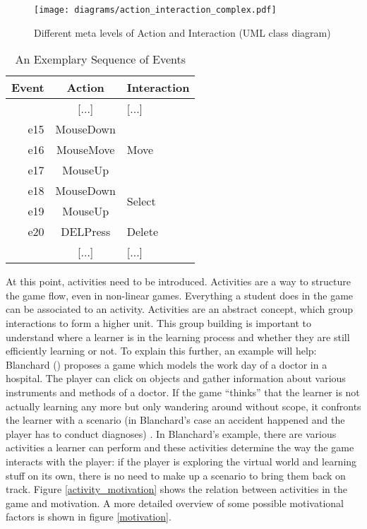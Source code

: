 \begin{figure}
    \centering
    \texttt{[image: diagrams/action\_interaction\_complex.pdf]}
    \caption[Different meta levels of Action and Interaction (UML class diagram)]
    {Different meta levels of Action and Interaction (UML class diagram)}
    \label{action_interaction_complex}
\end{figure}

\begin{table}
\caption[An Exemplary Sequence of Events]
{An Exemplary Sequence of Events}
\centering
\begin{tabular}{|r|c|l|}
    \hline
    Event & Action & Interaction \\ \hline
    [...] & [...] & [...] \\
    \hline \hline
    e15 & MouseDown & \multirow{3}{*}{Move} \\
    e16 & MouseMove & \\
    e17 & MouseUp & \\
    \hline \hline
    e18 & MouseDown & \multirow{2}{*}{Select} \\
    e19 & MouseUp & \\
    \hline \hline
    e20 & DELPress & Delete \\
    \hline \hline
    [...] & [...] & [...] \\ \hline
    \hline
\end{tabular}
\label{table:sequence}
\end{table}

At this point, activities need to be introduced. Activities are a way to
structure the game flow, even in non-linear games. Everything a student does
in the game can be associated to an activity. Activities are an abstract
concept, which group interactions to form a higher unit. This group building
is important to understand where a learner is in the learning process and
whether they are still efficiently learning or not. To explain this further, an
example will help: Blanchard (\cite{Blanchard2004b, Blanchard2009}) proposes
a game which models the work day of a
doctor in a hospital. The player can click on objects and gather information
about various instruments and methods of a doctor. If the game ``thinks'' that the learner is
not actually learning any more but only wandering around without scope, it
confronts the learner with a scenario (in Blanchard's case an accident
happened and the player has to conduct diagnoses) \cite{Blanchard2004b}. In
Blanchard's example, there are various activities a learner can perform and
these activities determine the way the game interacts with the player: if the
player is exploring the virtual world and learning stuff on its own, there is
no need to make up a scenario to bring them back on track. Figure
\ref{activity_motivation} shows the
relation between activities in the game and motivation. A more detailed
overview of some possible motivational factors is shown in figure
\ref{motivation}.

